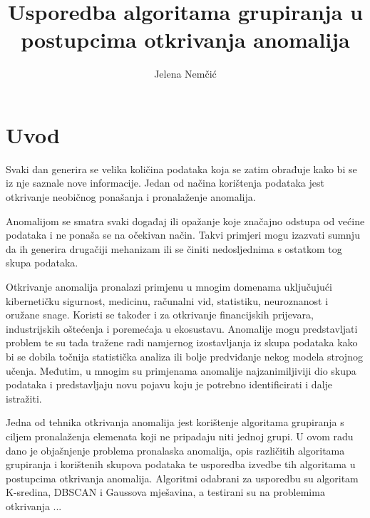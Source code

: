 \documentclass[utf8, diplomski, numeric]{fer}
\begin{document}

\title{Usporedba algoritama grupiranja u postupcima otkrivanja anomalija}

\author{Jelena Nemčić}

\maketitle



\zahvala{}

\tableofcontents

\chapter{Uvod}

Svaki dan generira se velika količina podataka koja se zatim obrađuje kako bi se iz nje saznale nove informacije. Jedan od načina korištenja podataka jest otkrivanje neobičnog ponašanja i pronalaženje anomalija.

Anomalijom se smatra svaki događaj ili opažanje koje značajno odstupa od većine podataka i ne ponaša se na očekivan način. Takvi primjeri mogu izazvati sumnju da ih generira drugačiji mehanizam ili se činiti nedosljednima s ostatkom tog skupa podataka.

Otkrivanje anomalija pronalazi primjenu u mnogim domenama uključujući kibernetičku sigurnost, medicinu, računalni vid, statistiku, neuroznanost i oružane snage. Koristi se također i za otkrivanje financijskih prijevara, industrijskih oštećenja i poremećaja u ekosustavu. Anomalije mogu predstavljati problem te su tada tražene radi namjernog izostavljanja iz skupa podataka kako bi se dobila točnija statistička analiza ili bolje predviđanje nekog modela strojnog učenja. Međutim, u mnogim su primjenama anomalije najzanimiljiviji dio skupa podataka i predstavljaju novu pojavu koju je potrebno identificirati i dalje istražiti.

Jedna od tehnika otkrivanja anomalija jest korištenje algoritama grupiranja s ciljem pronalaženja elemenata koji ne pripadaju niti jednoj grupi. U ovom radu dano je objašnjenje problema pronalaska anomalija, opis različitih algoritama grupiranja i korištenih skupova podataka te usporedba izvedbe tih algoritama u postupcima otkrivanja anomalija. Algoritmi odabrani za usporedbu su algoritam K-sredina, DBSCAN i Gaussova mješavina, a testirani su na problemima otkrivanja ...
\end{document}
